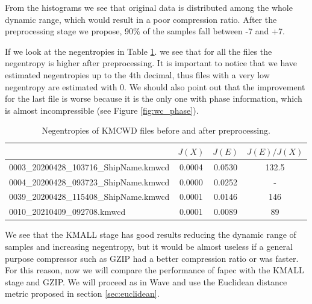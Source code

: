 From the histograms we see that original data is distributed among the whole dynamic range, which would result in a poor compression ratio. After the preprocessing stage we propose, 90\% of the samples fall between -7 and +7.

If we look at the negentropies in Table \ref{tab:negentropies_kmall}. we see that for all the files the negentropy is higher after preprocessing. It is important to notice that we have estimated negentropies up to the 4th decimal, thus files with a very low negentropy are estimated with 0. We should also point out that the improvement for the last file is worse because it is the only one with phase information, which is almost incompressible (see Figure \ref{fig:wc_phase}).

\begin{table}[h!]
\normalsize
\centering
\begin{tabular}{|l|c|c|c|}
	\hline
	\rowcolor[HTML]{d6cefc} 
	\multicolumn{1}{|c|}{\cellcolor[HTML]{d6cefc}Filename}         & $J(X)$                           & $J(E)$                           & $J(E)/J(X)$ \\ \hline
	\cellcolor[HTML]{FFFFFF}0003\_20200428\_103716\_ShipName.kmwcd & \cellcolor[HTML]{FFFFFF}0.0004 & \cellcolor[HTML]{FFFFFF}0.0530 & 132.5     \\ \hline
	\cellcolor[HTML]{FFFFFF}0004\_20200428\_093723\_ShipName.kmwcd & \cellcolor[HTML]{FFFFFF}0.0000      & \cellcolor[HTML]{FFFFFF}0.0252 & -         \\ \hline
	\cellcolor[HTML]{FFFFFF}0039\_20200428\_115408\_ShipName.kmwcd & \cellcolor[HTML]{FFFFFF}0.0001 & \cellcolor[HTML]{FFFFFF}0.0146 & 146       \\ \hline
	0010\_20210409\_092708.kmwcd                                   & 0.0001                         & 0.0089                         & 89        \\ \hline
\end{tabular}
\caption{Negentropies of KMCWD files before and after preprocessing.}
\label{tab:negentropies_kmall}
\end{table}

We see that the KMALL stage has good results reducing the dynamic range of samples and increasing negentropy, but it would be almost useless if a general purpose compressor such as GZIP had a better compression ratio or was faster. For this reason, now we will compare the performance of \acrshort{fapec} with the KMALL stage and GZIP. We will proceed as in Wave and use the Euclidean distance metric proposed in section \ref{sec:euclidean}.

